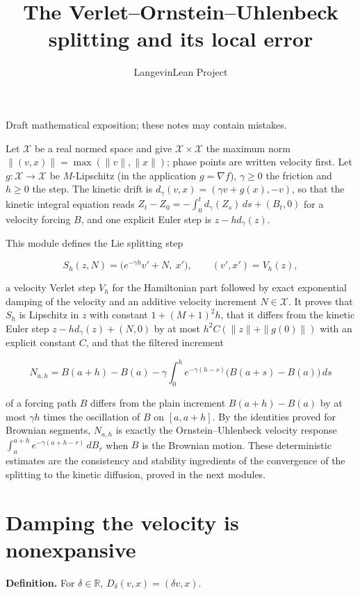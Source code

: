 \documentclass[11pt,a4paper]{article}
\title{\texorpdfstring{The Verlet–Ornstein–Uhlenbeck splitting and its local error}{The Verlet–Ornstein–Uhlenbeck splitting and its local error}}
\author{LangevinLean Project}
\date{}
\begin{document}
\maketitle
Draft mathematical exposition; these notes may contain mistakes.


Let \(\mathcal X\) be a real normed space and give \(\mathcal X\times\mathcal X\) the maximum norm \(\|(v,x)\|=\max(\|v\|,\|x\|)\); phase points are written velocity first. Let \(g:\mathcal X\to\mathcal X\) be \(M\)-Lipschitz (in the application \(g=\nabla f\)), \(\gamma\ge0\) the friction and \(h\ge0\) the step. The kinetic drift is \(d_\gamma(v,x)=(\gamma v+g(x),-v)\), so that the kinetic integral equation reads \(Z_t-Z_0=-\int_0^td_\gamma(Z_s)\,ds+(B_t,0)\) for a velocity forcing \(B\), and one explicit Euler step is \(z-hd_\gamma(z)\).




This module defines the Lie splitting step


\[S_h(z,N)=\bigl(e^{-\gamma h}v'+N,\ x'\bigr),\qquad(v',x')=V_h(z),\]


a velocity Verlet step \(V_h\) for the Hamiltonian part followed by exact exponential damping of the velocity and an additive velocity increment \(N\in\mathcal X\). It proves that \(S_h\) is Lipschitz in \(z\) with constant \(1+(M+1)^2h\), that it differs from the kinetic Euler step \(z-hd_\gamma(z)+(N,0)\) by at most \(h^2C(\|z\|+\|g(0)\|)\) with an explicit constant \(C\), and that the filtered increment


\[N_{a,h}=B(a+h)-B(a)-\gamma\int_0^he^{-\gamma(h-s)}\bigl(B(a+s)-B(a)\bigr)\,ds\]


of a forcing path \(B\) differs from the plain increment \(B(a+h)-B(a)\) by at most \(\gamma h\) times the oscillation of \(B\) on \([a,a+h]\). By the identities proved for Brownian segments, \(N_{a,h}\) is exactly the Ornstein–Uhlenbeck velocity response \(\int_a^{a+h}e^{-\gamma(a+h-r)}\,dB_r\) when \(B\) is the Brownian motion. These deterministic estimates are the consistency and stability ingredients of the convergence of the splitting to the kinetic diffusion, proved in the next modules.


\section{\texorpdfstring{Damping the velocity is nonexpansive}{Damping the velocity is nonexpansive}}


\textbf{Definition.} For \(\delta\in\mathbb R\), \(D_\delta(v,x)=(\delta v,x)\).
\end{document}
